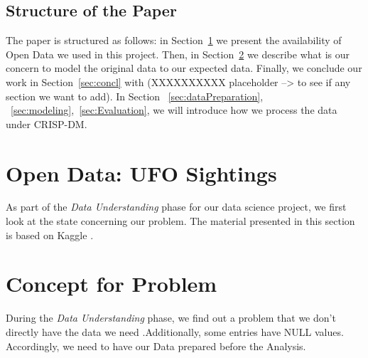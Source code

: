 \documentclass[11pt, journal]{IEEEtran}
\begin{document}
\subsection{Structure of the Paper} \label{subsec:struct}
The paper is structured as follows: in Section~\ref{sec:dataunderstanding} we present the availability of Open Data we used in this project.
Then, in Section~\ref{sec:concept} we describe what is our concern to model the original data to our expected data. Finally, we conclude our work in Section~\ref{sec:concl} with (XXXXXXXXXX placeholder --> to see if any section we want to add).
In Section ~\ref{sec:dataPreparation}, ~\ref{sec:modeling},~\ref{sec:Evaluation}, we will introduce how we process the data under CRISP-DM.


\section{Open Data: UFO Sightings} \label{sec:dataunderstanding}
As part of the \emph{Data Understanding} phase for our data science project, we first look at the state concerning our problem. The material presented in this section is based on Kaggle \cite{kaggle}.

\section{Concept for Problem} \label{sec:concept}
During the \emph{Data Understanding} phase, we find out a problem that we don't directly have the data we need .Additionally, some entries have NULL values. Accordingly, we need to have our Data prepared before the Analysis.
\end{document}
